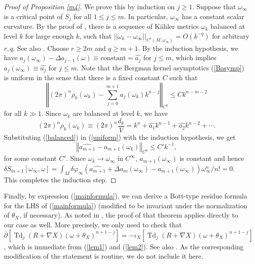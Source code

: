 \documentclass[12pt,reqno,a4paper]{amsart}
\numberwithin{equation}{section}
\def\bp{\bar\partial}
\DeclareMathOperator{\Td}{Td}
\theoremstyle{remark}
\theoremstyle{dotless}
\begin{document}
\begin{proof}[Proof of Proposition \ref{m4}]
We prove this by induction on $j\geq 1$. Suppose that $\omega_\infty$ is a critical point of $S_j$ for all $1\leq j\leq m$. In particular, $\omega_\infty$ has a constant scalar curvature. By the proof of \cite[Theorem 3]{donaldson2001scalar}, there is a sequence of K\"ahler metrics $\omega_k$ balanced at level $k$ for large enough $k$, such that $||\omega_k-\omega_\infty||_{C^r(M,\omega_\infty)}=O(k^{-q})$ for arbitrary $r,q$. See also \cite[Section 4.3]{donaldson2001scalar}. Choose $r\geq 2m$ and $q\geq m+1$. By the induction hypothesis, we have $a_j(\omega_\infty)-\Delta a_{j-1}(\omega)\equiv\text{constant}=\widehat{a_j}$ for $j\leq m$, which implies $a_j(\omega_\infty)\equiv\widehat{a_j}$ for $j\leq m$. Note that the Bergman kernel asymptotics (\ref{Basymp}) is uniform in the sense that there is a fixed constant $C$ such that
\begin{equation}\label{uniform}
\left\Vert (2\pi)^n\rho_k(\omega_k)-\sum^{m+1}_{j=0} a_j(\omega_k)k^{n-j} \right\Vert_{C^0} \leq Ck^{n-m-2}
\end{equation}
for all $k\gg1$. Since $\omega_k$ are balanced at level $k$, we have
\begin{equation}\label{balanced}
(2\pi)^n\rho_k(\omega_k)\equiv(2\pi)^n \frac{d_k}{V} =  k^n+\widehat{a_1}k^{n-1}+\widehat{a_2}k^{n-2} +\cdots.
\end{equation}
Substituting (\ref{balanced}) in (\ref{uniform}) with the induction hypothesis, we get
\begin{equation*}
\left\Vert \widehat{a_{m+1}}-a_{m+1}(\omega_k) \right\Vert_{C^0} \leq C'k^{-1},
\end{equation*}
for some constant $C'$. Since $\omega_k\rightarrow\omega_\infty$ in $C^\infty$, $a_{m+1}(\omega_\infty)$ is constant and hence $\delta S_{m+1}[\omega_\infty,\omega]=\int_M \delta \varphi_\infty(\widehat{a_{m+1}}+\Delta a_{m}(\omega_\infty)-a_{m+1}(\omega_\infty))\omega_\infty^n/n!=0 $. This completes the induction step.
\end{proof}

Finally, by expression (\ref{mainformula}), we can derive a Bott-type residue formula for the LHS of (\ref{mainformula}) (modified to be invariant under the normalization of $\theta_X$, if necessary). As noted in \cite[Theorem 6.3]{tianresidue}, the proof of that theorem applies directly to our case as well. More precisely, we only need to check that $\bp[ \Td_j(R+\nabla X)(\omega+\theta_X)^{n+1-j}]= -\iota_X [\Td_j(R+\nabla X)(\omega+\theta_X)^{n+1-j}]$, which is immediate from (\ref{lem1}) and (\ref{lem2}). See also \cite[Theorem 5.2.8]{futaki2006kahler}. As the corresponding modification of the statement is routine, we do not include it here.
\end{document}
